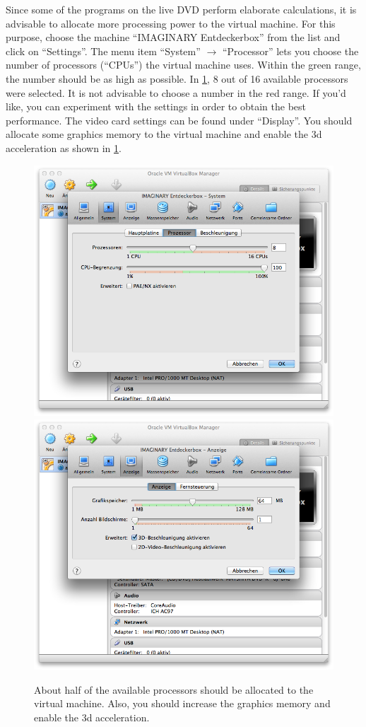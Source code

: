 \documentclass[a4paper,10pt,BCOR=0mm,DIV=14]{scrartcl}
\def\gfxscale{0.27}
\newcommand{\command}[1]{\textsf{\enquote{#1}}}
\begin{document}
Since some of the programs on the live DVD perform elaborate calculations, it is advisable to allocate more processing power to the virtual machine. For this purpose, choose the machine \command{IMAGINARY Entdeckerbox} from the list and click on \command{Settings}. The menu item \command{System} $\rightarrow$ \command{Processor} lets you choose the number of processors (\command{CPUs}) the virtual machine uses. Within the green range, the number should be as high as possible. In \cref{VBox60}, 8 out of 16 available processors were selected. It is not advisable to choose a number in the red range. If you'd like, you can experiment with the settings in order to obtain the best performance. The video card settings can be found under \command{Display}. You should allocate some graphics memory to the virtual machine and enable the 3d acceleration as shown in \cref{VBox60}. 
\begin{figure}[h]
\centering\includegraphics[scale=\gfxscale]{VBox60}
\qquad\includegraphics[scale=\gfxscale]{VBox61}
\caption{About half of the available processors should be allocated to the virtual machine. Also, you should increase the graphics memory and enable the 3d acceleration.}
\label{VBox60}
\end{figure}
\end{document}
